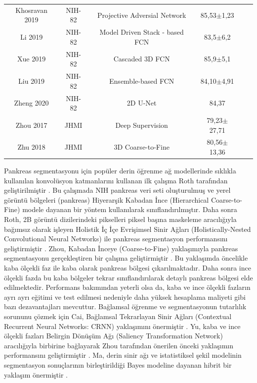 \begin{table}[h!]
\begin{tabular}{cccccc}
		Khosravan 2019\cite{khosravan2019pan}& NIH-82    &  Projective Adversial Network        & 85,53$\pm$1,23 \\
		Li 2019       \cite{li2020model}       &  NIH-82    &  Model Driven Stack - based FCN      & 83,5$\pm$6,2  \\
		Xue 2019       \cite{xue2019cascaded}     &  NIH-82    &  Cascaded 3D FCN      & 85,9$\pm$5,1  \\	
		Liu 2019       \cite{liu2019automatic}     &  NIH-82    &  Ensemble-based FCN  & 84,10$\pm$4,91  \\		 
		Zheng 2020     \cite{zheng2020deep}  &  NIH-82    &  2D U-Net      & 84,37 \\	 
		Zhou 2017    \cite{zhou2017deep}     &  JHMI      &  Deep Supervision  & 79,23$\pm$27,71   \\
		Zhu 2018      \cite{zhu20183d}      &  JHMI      &  3D Coarse-to-Fine & 80,56$\pm$13,36   \\
		\bottomrule
	\end{tabular}
\end{table}

Pankreas segmentasyonu için popüler derin öğrenme ağ modellerinde sıklıkla kullanılan konvolüsyon katmanlarını kullanan ilk çalışma Roth tarafından geliştirilmiştir \cite{roth2015deep}. Bu çalışmada NIH pankreas veri seti oluşturulmuş ve yerel görüntü bölgeleri (pankreas) Hiyerarşik Kabadan İnce (Hierarchical Coarse-to-Fine) modele dayanan bir yöntem kullanılarak sınıflandırılmıştır. Daha sonra Roth, 2B görüntü dizilerindeki pikselleri piksel başına maskeleme aracılığıyla bağımsız olarak işleyen Holistik İç İçe Evrişimsel Sinir Ağları (Holistically-Nested Convolutional Neural Networks) ile pankreas segmentasyon performansını geliştirmiştir \cite{roth2016spatial,roth2018spatial}. Zhou, Kabadan İnceye (Coarse-to-Fine) yaklaşımıyla pankreas segmentasyonu gerçekleştiren bir çalışma geliştirmiştir \cite{zhou2016pancreas}. Bu yaklaşımda öncelikle kaba ölçekli faz ile kaba olarak pankreas bölgesi çıkarılmaktadır. Daha sonra ince ölçekli fazda bu kaba bölgeler tekrar sınıflandırılarak detaylı pankreas bölgesi elde edilmektedir. Performans bakımından yeterli olsa da, kaba ve ince ölçekli fazların ayrı ayrı eğitimi ve test edilmesi nedeniyle daha yüksek hesaplama maliyeti gibi bazı dezavantajları mevcuttur. Bağlamsal öğrenme ve segmentasyonun tutarlılık sorununu çözmek için Cai, Bağlamsal Tekrarlayan Sinir Ağları (Contextual Recurrent Neural Networks: CRNN) yaklaşımını önermiştir \cite{cai2017improving}. Yu, kaba ve ince ölçekli fazları Belirgin Dönüşüm Ağı (Saliency Transformation Network) aracılığıyla birbirine bağlayarak Zhou tarafından önerilen \cite{zhou2016pancreas} önceki yaklaşımın performansını geliştirmiştir \cite{yu2018recurrent}. Ma, derin sinir ağı ve istatistiksel şekil modelinin segmentasyon sonuçlarının birleştirildiği Bayes modeline dayanan hibrit bir yaklaşım önermiştir \cite{ma2018novel}. 

